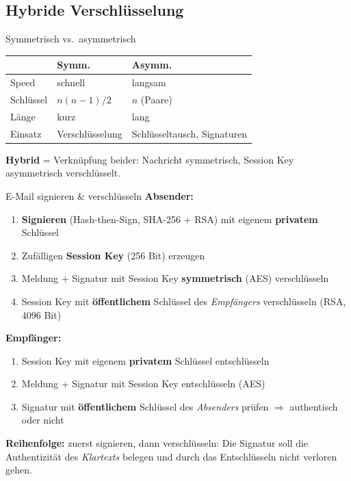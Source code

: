 \documentclass[a4paper, fontsize=7pt]{scrartcl}
\renewcommand*{\arraystretch}{1.5}  %
\begin{document}
\subsection{Hybride Verschlüsselung}

\begin{mainbox}{Symmetrisch vs.\ asymmetrisch}
\renewcommand*{\arraystretch}{1.2}
\begin{tabularx}{\linewidth}{@{}l|X|X@{}}
 & \textbf{Symm.} & \textbf{Asymm.} \\
\hline
Speed & schnell & langsam \\
Schlüssel & $n(n-1)/2$ & $n$ (Paare) \\
Länge & kurz & lang \\
Einsatz & Verschlüsselung & Schlüsseltausch, Signaturen \\
\end{tabularx}
\textbf{Hybrid} = Verknüpfung beider: Nachricht symmetrisch, Session Key
asymmetrisch verschlüsselt.
\end{mainbox}

\begin{mainbox}{E-Mail signieren \& verschlüsseln}
\textbf{Absender:}
\begin{enumerate}
    \item \textbf{Signieren} (Hash-then-Sign, SHA-256 + RSA) mit eigenem
          \textbf{privatem} Schlüssel
    \item Zufälligen \textbf{Session Key} (256 Bit) erzeugen
    \item Meldung + Signatur mit Session Key \textbf{symmetrisch} (AES)
          verschlüsseln
    \item Session Key mit \textbf{öffentlichem} Schlüssel des \emph{Empfängers}
          verschlüsseln (RSA, 4096 Bit)
\end{enumerate}
\textbf{Empfänger:}
\begin{enumerate}
    \item Session Key mit eigenem \textbf{privatem} Schlüssel entschlüsseln
    \item Meldung + Signatur mit Session Key entschlüsseln (AES)
    \item Signatur mit \textbf{öffentlichem} Schlüssel des \emph{Absenders}
          prüfen $\Rightarrow$ authentisch oder nicht
\end{enumerate}
\textbf{Reihenfolge:} zuerst signieren, dann verschlüsseln: Die Signatur soll die
Authentizität des \emph{Klartexts} belegen und durch das Entschlüsseln nicht
verloren gehen.
\end{mainbox}
\end{document}
